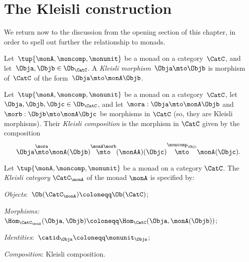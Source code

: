 

\section{The Kleisli construction}
\label{sec:Kleisli}

We return now to the discussion from the opening section of this chapter, in order to spell out further the relationship to monads. 

\begin{ctdefinition}
    \label{def:kleislimor}
Let~$\tup{\monA, \moncomp, \monunit}$ be a monad on a category~$\CatC$, and let~$\Obja, \Objb \in \Ob_\CatC$. A
\emph{Kleisli morphism}~$\Obja \mto \Objb$ is morphism of~$\CatC$ of the form~$\Obja \mto \monA \Objb$.
\end{ctdefinition}


\begin{ctdefinition}
    \label{def:kleislicomp}
Let~$\tup{\monA, \moncomp, \monunit}$ be a monad on a category~$\CatC$, let~$\Obja, \Objb, \Objc \in \Ob_\CatC$,  and let~$\mora : \Obja \mto \monA \Objb$ and $\morb : \Objb \mto \monA \Objc$ be morphisms in $\CatC$ (so, they are Kleisli morphisms). Their \emph{Kleisli composition} is the morphism in $\CatC$ given by the composition
\begin{equation}
\Obja \overset{\mora}{\mto} \monA(\Objb) \overset{\monA \morb}{\mto} (\monAA)(\Objc) \overset{\moncomp_\Objc}{\mto} \monA(\Objc).
\end{equation}
\end{ctdefinition}

\begin{ctdefinition}
    \label{def:kleislicat}
Let $\tup{\monA, \moncomp, \monunit}$ be a monad on a category $\CatC$. The \emph{Kleisli category} $\CatC_\monA$ of the monad $\monA$ is specified by:
\begin{compactenum}
\item \emph{Objects}:~$\Ob(\CatC_\monA) \coloneqq \Ob(\CatC)$;
\item \emph{Morphisms:}~$\Hom_{\CatC_\monA}(\Obja, \Objb) \coloneqq \Hom_{\CatC}(\Obja, \monA(\Objb))$;
\item \emph{Identities}:~$\catid_\Obja \coloneqq \monunit_\Obja$;
\item \emph{Composition}: Kleisli composition. 
\end{compactenum}
\end{ctdefinition}


